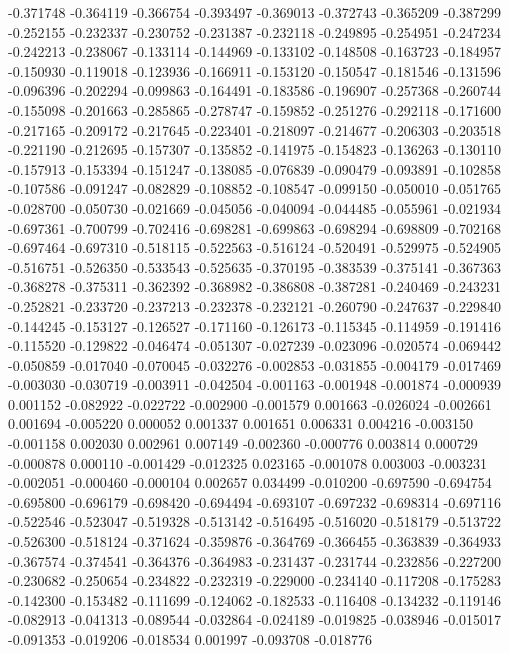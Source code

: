 -0.371748
-0.364119
-0.366754
-0.393497
-0.369013
-0.372743
-0.365209
-0.387299
-0.252155
-0.232337
-0.230752
-0.231387
-0.232118
-0.249895
-0.254951
-0.247234
-0.242213
-0.238067
-0.133114
-0.144969
-0.133102
-0.148508
-0.163723
-0.184957
-0.150930
-0.119018
-0.123936
-0.166911
-0.153120
-0.150547
-0.181546
-0.131596
-0.096396
-0.202294
-0.099863
-0.164491
-0.183586
-0.196907
-0.257368
-0.260744
-0.155098
-0.201663
-0.285865
-0.278747
-0.159852
-0.251276
-0.292118
-0.171600
-0.217165
-0.209172
-0.217645
-0.223401
-0.218097
-0.214677
-0.206303
-0.203518
-0.221190
-0.212695
-0.157307
-0.135852
-0.141975
-0.154823
-0.136263
-0.130110
-0.157913
-0.153394
-0.151247
-0.138085
-0.076839
-0.090479
-0.093891
-0.102858
-0.107586
-0.091247
-0.082829
-0.108852
-0.108547
-0.099150
-0.050010
-0.051765
-0.028700
-0.050730
-0.021669
-0.045056
-0.040094
-0.044485
-0.055961
-0.021934
-0.697361
-0.700799
-0.702416
-0.698281
-0.699863
-0.698294
-0.698809
-0.702168
-0.697464
-0.697310
-0.518115
-0.522563
-0.516124
-0.520491
-0.529975
-0.524905
-0.516751
-0.526350
-0.533543
-0.525635
-0.370195
-0.383539
-0.375141
-0.367363
-0.368278
-0.375311
-0.362392
-0.368982
-0.386808
-0.387281
-0.240469
-0.243231
-0.252821
-0.233720
-0.237213
-0.232378
-0.232121
-0.260790
-0.247637
-0.229840
-0.144245
-0.153127
-0.126527
-0.171160
-0.126173
-0.115345
-0.114959
-0.191416
-0.115520
-0.129822
-0.046474
-0.051307
-0.027239
-0.023096
-0.020574
-0.069442
-0.050859
-0.017040
-0.070045
-0.032276
-0.002853
-0.031855
-0.004179
-0.017469
-0.003030
-0.030719
-0.003911
-0.042504
-0.001163
-0.001948
-0.001874
-0.000939
0.001152
-0.082922
-0.022722
-0.002900
-0.001579
0.001663
-0.026024
-0.002661
0.001694
-0.005220
0.000052
0.001337
0.001651
0.006331
0.004216
-0.003150
-0.001158
0.002030
0.002961
0.007149
-0.002360
-0.000776
0.003814
0.000729
-0.000878
0.000110
-0.001429
-0.012325
0.023165
-0.001078
0.003003
-0.003231
-0.002051
-0.000460
-0.000104
0.002657
0.034499
-0.010200
-0.697590
-0.694754
-0.695800
-0.696179
-0.698420
-0.694494
-0.693107
-0.697232
-0.698314
-0.697116
-0.522546
-0.523047
-0.519328
-0.513142
-0.516495
-0.516020
-0.518179
-0.513722
-0.526300
-0.518124
-0.371624
-0.359876
-0.364769
-0.366455
-0.363839
-0.364933
-0.367574
-0.374541
-0.364376
-0.364983
-0.231437
-0.231744
-0.232856
-0.227200
-0.230682
-0.250654
-0.234822
-0.232319
-0.229000
-0.234140
-0.117208
-0.175283
-0.142300
-0.153482
-0.111699
-0.124062
-0.182533
-0.116408
-0.134232
-0.119146
-0.082913
-0.041313
-0.089544
-0.032864
-0.024189
-0.019825
-0.038946
-0.015017
-0.091353
-0.019206
-0.018534
0.001997
-0.093708
-0.018776
